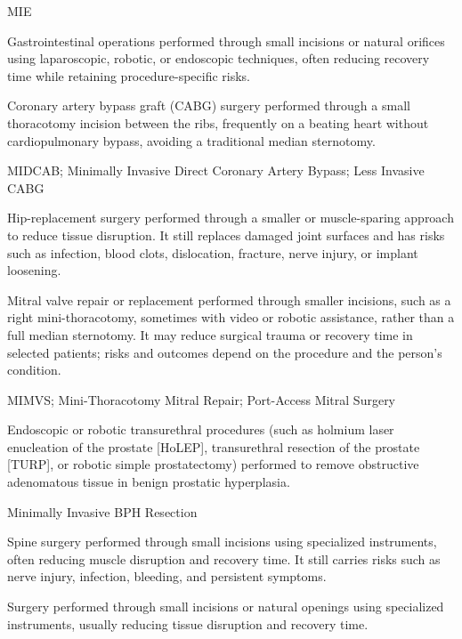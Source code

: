 \synonyms
MIE

 Gastrointestinal operations performed through small incisions or natural orifices using laparoscopic, robotic, or endoscopic techniques, often reducing recovery time while retaining procedure-specific risks.

 Coronary artery bypass graft (CABG) surgery performed through a small thoracotomy incision between the ribs, frequently on a beating heart without cardiopulmonary bypass, avoiding a traditional median sternotomy.

\synonyms
MIDCAB; Minimally Invasive Direct Coronary Artery Bypass; Less Invasive CABG

 Hip-replacement surgery performed through a smaller or muscle-sparing approach to reduce tissue disruption. It still replaces damaged joint surfaces and has risks such as infection, blood clots, dislocation, fracture, nerve injury, or implant loosening.

 Mitral valve repair or replacement performed through smaller incisions, such as a right mini-thoracotomy, sometimes with video or robotic assistance, rather than a full median sternotomy. It may reduce surgical trauma or recovery time in selected patients; risks and outcomes depend on the procedure and the person's condition.

\synonyms
MIMVS; Mini-Thoracotomy Mitral Repair; Port-Access Mitral Surgery

 Endoscopic or robotic transurethral procedures (such as holmium laser enucleation of the prostate [HoLEP], transurethral resection of the prostate [TURP], or robotic simple prostatectomy) performed to remove obstructive adenomatous tissue in benign prostatic hyperplasia.

\synonyms
Minimally Invasive BPH Resection

 Spine surgery performed through small incisions using specialized instruments, often reducing muscle disruption and recovery time. It still carries risks such as nerve injury, infection, bleeding, and persistent symptoms.

 Surgery performed through small incisions or natural openings using specialized instruments, usually reducing tissue disruption and recovery time.

